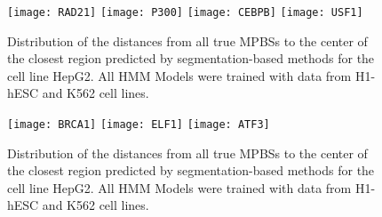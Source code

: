 \documentclass[11pt,a4]{article}
\begin{document}
\begin{figure}[h]
\centering
    \texttt{[image: RAD21]}
    \texttt{[image: P300]}
    \texttt{[image: CEBPB]}
    \texttt{[image: USF1]}
\caption{Distribution of the distances from all true MPBSs to the center of the closest region predicted by segmentation-based methods for the cell line HepG2. All HMM Models were trained with data from H1-hESC and K562 cell lines.}
\label{fig:boxplot.HepG2.fdr_4.6}
\end{figure}

\begin{figure}[h]
\centering
    \texttt{[image: BRCA1]}
    \texttt{[image: ELF1]}
    \texttt{[image: ATF3]}
\caption{Distribution of the distances from all true MPBSs to the center of the closest region predicted by segmentation-based methods for the cell line HepG2. All HMM Models were trained with data from H1-hESC and K562 cell lines.}
\label{fig:boxplot.HepG2.fdr_4.7}
\end{figure}
\end{document}
